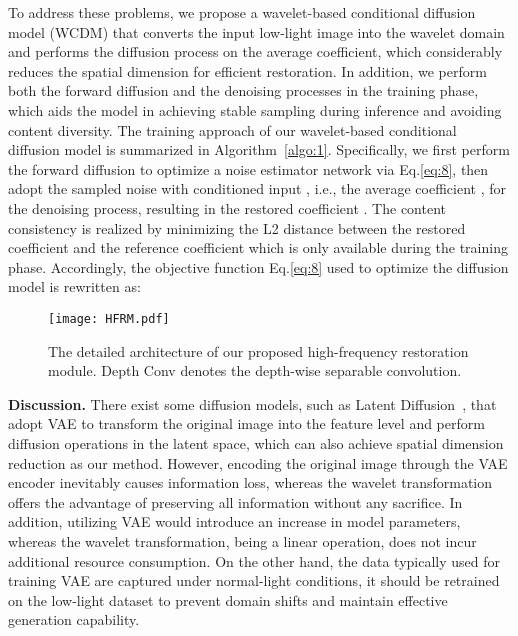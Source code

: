 To address these problems, we propose a wavelet-based conditional diffusion model (WCDM) that converts the input low-light image  into the wavelet domain and performs the diffusion process on the average coefficient, which considerably reduces the spatial dimension for efficient restoration. In addition, we perform both the forward diffusion and the denoising processes in the training phase, which aids the model in achieving stable sampling during inference and avoiding content diversity. The training approach of our wavelet-based conditional diffusion model is summarized in Algorithm~\ref{algo:1}. Specifically, we first perform the forward diffusion to optimize a noise estimator network via Eq.\ref{eq:8}, then adopt the sampled noise  with conditioned input , i.e., the average coefficient , for the denoising process, resulting in the restored coefficient . The content consistency is realized by minimizing the L2 distance between the restored coefficient and the reference coefficient  which is only available during the training phase. Accordingly, the objective function Eq.\ref{eq:8} used to optimize the diffusion model is rewritten as:

\begin{figure}[!t]
	\centering
	\texttt{[image: HFRM.pdf]}
	\caption{The detailed architecture of our proposed high-frequency restoration module. Depth Conv denotes the depth-wise separable convolution.}
	\label{fig:HFRM_architecture}
\end{figure}

{\textbf{Discussion.} There exist some diffusion models, such as Latent Diffusion~\cite{latent_diffusion}, that adopt VAE to transform the original image into the feature level and perform diffusion operations in the latent space, which can also achieve spatial dimension reduction as our method. However, encoding the original image through the VAE encoder inevitably causes information loss, whereas the wavelet transformation offers the advantage of preserving all information without any sacrifice. In addition, utilizing VAE would introduce an increase in model parameters, whereas the wavelet transformation, being a linear operation, does not incur additional resource consumption. On the other hand, the data typically used for training VAE are captured under normal-light conditions, it should be retrained on the low-light dataset to prevent domain shifts and maintain effective generation capability.}

